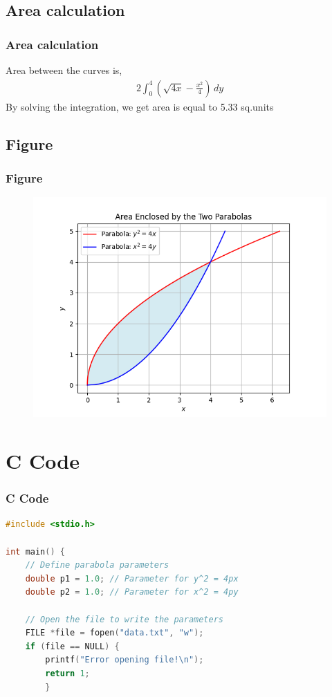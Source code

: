 \documentclass{beamer}
\providecommand{\brak}[1]{\ensuremath{\left(#1\right)}}
\theoremstyle{remark}
\numberwithin{equation}{section}
\begin{document}
\subsection{Area calculation}
\begin{frame}
\frametitle{Area calculation}
Area between the curves is,
\begin{align}
2\int_{0}^{4} \brak{\sqrt{4x}-\frac{x^2}{4}} \, dy 
\end{align}
By solving the integration, we get area is equal to 5.33 sq.units
\end{frame}
\subsection{Figure}
\begin{frame}
\frametitle{Figure}
\begin{figure}
   \centering
   \includegraphics[width=\linewidth]{figs/Figure_1.png}
   \label{stemplot}
   \caption{}
\end{figure}
\end{frame}
\section{C Code}
\begin{frame}[fragile]
\frametitle{C Code }
\begin{lstlisting}[language=C]
#include <stdio.h>

int main() {
    // Define parabola parameters
    double p1 = 1.0; // Parameter for y^2 = 4px
    double p2 = 1.0; // Parameter for x^2 = 4py

    // Open the file to write the parameters
    FILE *file = fopen("data.txt", "w");
    if (file == NULL) {
        printf("Error opening file!\n");
        return 1;
        }
    
\end{lstlisting}
\end{frame}
\end{document}
